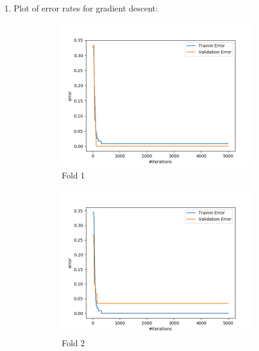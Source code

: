 \documentclass[11pt]{scrartcl}
\begin{document}
	\begin{enumerate}
		\item Plot of error rates for gradient descent:
			\begin{figure}[h!]
				\centering
				\begin{subfigure}[b]{0.4\linewidth}
					\includegraphics[width=\linewidth]{errorPlotFold1.png}
					\caption{Fold 1}
				\end{subfigure}
				\begin{subfigure}[b]{0.4\linewidth}
					\includegraphics[width=\linewidth]{errorPlotFold2.png}
					\caption{Fold 2}
				\end{subfigure}
				\begin{subfigure}[b]{0.4\linewidth}

\end{subfigure}
\end{figure}
\end{enumerate}
\end{document}
